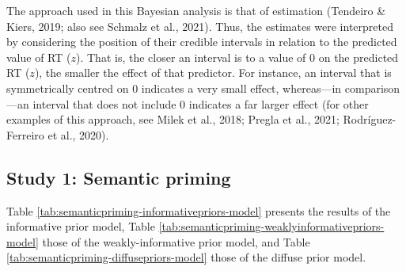 \documentclass[
  12pt,
  man,floatsintext]{apa7}
\begin{document}
The approach used in this Bayesian analysis is that of estimation (Tendeiro \& Kiers, 2019; also see Schmalz et al., 2021). Thus, the estimates were interpreted by considering the position of their credible intervals in relation to the predicted value of RT (\(z\)). That is, the closer an interval is to a value of 0 on the predicted RT (\(z\)), the smaller the effect of that predictor. For instance, an interval that is symmetrically centred on 0 indicates a very small effect, whereas---in comparison---an interval that does not include 0 indicates a far larger effect (for other examples of this approach, see Milek et al., 2018; Pregla et al., 2021; Rodríguez-Ferreiro et al., 2020).

\hypertarget{study-1-semantic-priming-3}{%
\subsection{Study 1: Semantic priming}\label{study-1-semantic-priming-3}}

Table \ref{tab:semanticpriming-informativepriors-model} presents the results of the informative prior model, Table \ref{tab:semanticpriming-weaklyinformativepriors-model} those of the weakly-informative prior model, and Table \ref{tab:semanticpriming-diffusepriors-model} those of the diffuse prior model.
\end{document}
